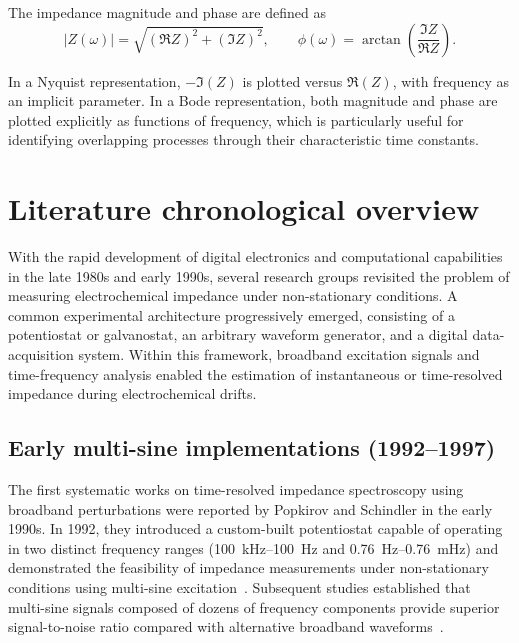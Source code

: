 The impedance magnitude and phase are defined as
\begin{equation}
    |Z(\omega)| = \sqrt{ (\Re Z)^2 + (\Im Z)^2 },
    \qquad
    \phi(\omega) = \arctan\!\left( \frac{\Im Z}{\Re Z} \right).
\end{equation}

In a Nyquist representation, $-\Im(Z)$ is plotted versus $\Re(Z)$, with frequency as an implicit parameter.
In a Bode representation, both magnitude and phase are plotted explicitly as functions of frequency, which is particularly useful for identifying overlapping processes through their characteristic time constants.


\chapter{Literature chronological overview}
\label{app:literature review stft}

With the rapid development of digital electronics and computational capabilities in the late 1980s and early 1990s, several research groups revisited the problem of measuring electrochemical impedance under non-stationary conditions.
A common experimental architecture progressively emerged, consisting of a potentiostat or galvanostat, an arbitrary waveform generator, and a digital data-acquisition system.
Within this framework, broadband excitation signals and time-frequency analysis enabled the estimation of instantaneous or time-resolved impedance during electrochemical drifts.

\section*{Early multi-sine implementations (1992--1997)}

The first systematic works on time-resolved impedance spectroscopy using broadband perturbations were reported by Popkirov and Schindler in the early 1990s.
In 1992, they introduced a custom-built potentiostat capable of operating in two distinct frequency ranges (100~kHz--100~Hz and 0.76~Hz--0.76~mHz) and demonstrated the feasibility of impedance measurements under non-stationary conditions using multi-sine excitation~\cite{popkirovNewImpedanceSpectrometer1992}.
Subsequent studies established that multi-sine signals composed of dozens of frequency components provide superior signal-to-noise ratio compared with alternative broadband waveforms~\cite{popkirovOptimizationPerturbationSignal1993a}.


